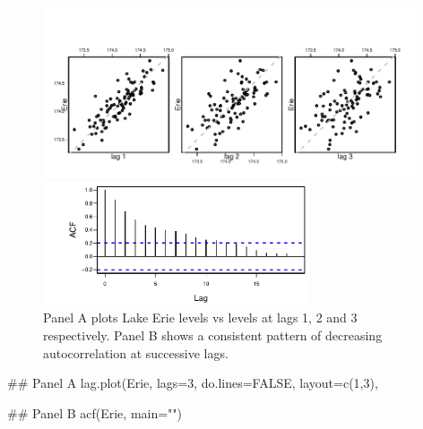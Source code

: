 \begin{figure}
\begin{Schunk}


\centerline{\includegraphics[width=0.98\textwidth]{figs/12-lagErie-1} }

\end{Schunk}
\vspace*{-3pt}

\begin{Schunk}


\centerline{\includegraphics[width=0.7\textwidth]{figs/12-acfErie-1} }

\end{Schunk}
\caption{Panel A plots Lake Erie levels vs levels at lags 1, 2 and 3
  respectively. Panel B shows a consistent pattern of decreasing
  autocorrelation at successive lags.
}\label{erie-lagplot}
\vspace*{-6pt}
\end{figure}

\begin{marginfigure}[-10cm]
\begin{Schunk}
\begin{Sinput}
## Panel A
lag.plot(Erie, lags=3,
         do.lines=FALSE,
         layout=c(1,3),
\end{Sinput}
\end{Schunk}
\begin{Schunk}
\begin{Sinput}
## Panel B
acf(Erie, main="")
\end{Sinput}
\end{Schunk}
\end{marginfigure}


